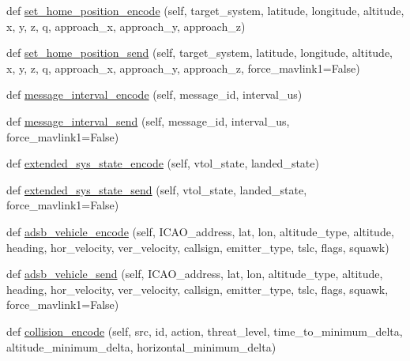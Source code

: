 \begin{DoxyCompactItemize}
\item 
def \hyperlink{classpymavlink_1_1dialects_1_1v10_1_1MAVLink_af70df46be3e9f279df905a1c32defd70}{set\+\_\+home\+\_\+position\+\_\+encode} (self, target\+\_\+system, latitude, longitude, altitude, x, y, z, q, approach\+\_\+x, approach\+\_\+y, approach\+\_\+z)
\item 
def \hyperlink{classpymavlink_1_1dialects_1_1v10_1_1MAVLink_a08f6254bd80120113550d4ebe5493eb7}{set\+\_\+home\+\_\+position\+\_\+send} (self, target\+\_\+system, latitude, longitude, altitude, x, y, z, q, approach\+\_\+x, approach\+\_\+y, approach\+\_\+z, force\+\_\+mavlink1=False)
\item 
def \hyperlink{classpymavlink_1_1dialects_1_1v10_1_1MAVLink_a19f009fc0c74ac62c78846c0595c4522}{message\+\_\+interval\+\_\+encode} (self, message\+\_\+id, interval\+\_\+us)
\item 
def \hyperlink{classpymavlink_1_1dialects_1_1v10_1_1MAVLink_ab2e87e5b4ed29e01a269e3db9f9ed659}{message\+\_\+interval\+\_\+send} (self, message\+\_\+id, interval\+\_\+us, force\+\_\+mavlink1=False)
\item 
def \hyperlink{classpymavlink_1_1dialects_1_1v10_1_1MAVLink_aceee34ad22cb568de2024ca9598b20b0}{extended\+\_\+sys\+\_\+state\+\_\+encode} (self, vtol\+\_\+state, landed\+\_\+state)
\item 
def \hyperlink{classpymavlink_1_1dialects_1_1v10_1_1MAVLink_a1bb0352c0c10ae0a6be8b40a99921a2c}{extended\+\_\+sys\+\_\+state\+\_\+send} (self, vtol\+\_\+state, landed\+\_\+state, force\+\_\+mavlink1=False)
\item 
def \hyperlink{classpymavlink_1_1dialects_1_1v10_1_1MAVLink_a50d042591843469808016d3104937809}{adsb\+\_\+vehicle\+\_\+encode} (self, I\+C\+A\+O\+\_\+address, lat, lon, altitude\+\_\+type, altitude, heading, hor\+\_\+velocity, ver\+\_\+velocity, callsign, emitter\+\_\+type, tslc, flags, squawk)
\item 
def \hyperlink{classpymavlink_1_1dialects_1_1v10_1_1MAVLink_aa24433c20c6689d1f0ad0ec1d3ccb08c}{adsb\+\_\+vehicle\+\_\+send} (self, I\+C\+A\+O\+\_\+address, lat, lon, altitude\+\_\+type, altitude, heading, hor\+\_\+velocity, ver\+\_\+velocity, callsign, emitter\+\_\+type, tslc, flags, squawk, force\+\_\+mavlink1=False)
\item 
def \hyperlink{classpymavlink_1_1dialects_1_1v10_1_1MAVLink_af2578875510284096cff3b214c9aefa3}{collision\+\_\+encode} (self, src, id, action, threat\+\_\+level, time\+\_\+to\+\_\+minimum\+\_\+delta, altitude\+\_\+minimum\+\_\+delta, horizontal\+\_\+minimum\+\_\+delta)

\end{DoxyCompactItemize}
